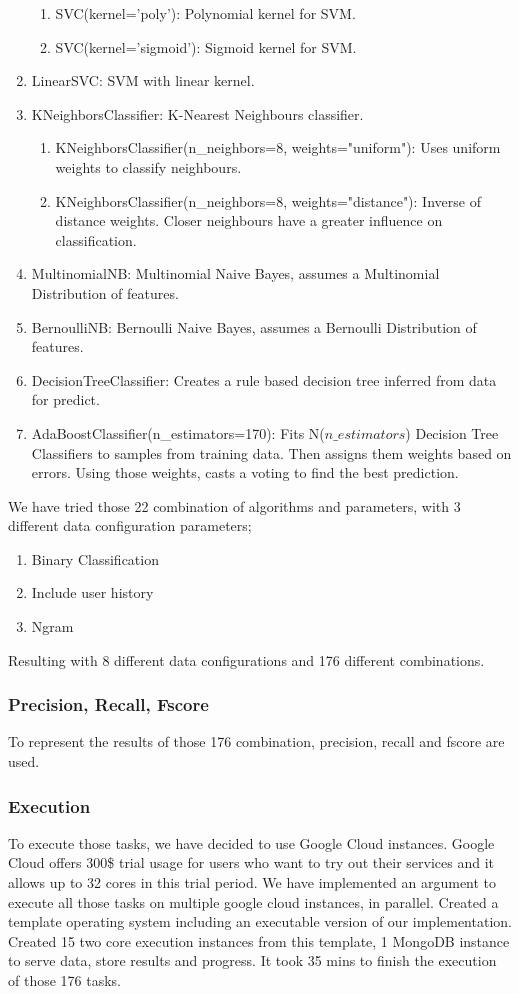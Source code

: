 \documentclass[twoside,11pt]{article}
\begin{document}
\begin{enumerate}
\begin{enumerate}
\item SVC(kernel='poly'): Polynomial kernel for SVM.
\item SVC(kernel='sigmoid'): Sigmoid kernel for SVM.
\end{enumerate}
\item LinearSVC: SVM with linear kernel.
\item KNeighborsClassifier: K-Nearest Neighbours classifier.
\begin{enumerate}
\item KNeighborsClassifier(n\_neighbors=8, weights="uniform"): Uses uniform weights to classify neighbours.
\item KNeighborsClassifier(n\_neighbors=8, weights="distance"): Inverse of distance weights. Closer neighbours have a greater influence on classification.
\end{enumerate}
\item MultinomialNB: Multinomial Naive Bayes, assumes a Multinomial Distribution of features.
\item BernoulliNB: Bernoulli Naive Bayes, assumes a Bernoulli Distribution of features.
\item DecisionTreeClassifier: Creates a rule based decision tree inferred from data for predict.
\item AdaBoostClassifier(n\_estimators=170): Fits N($n\_estimators$) Decision Tree Classifiers to samples from training data. Then assigns them weights based on errors. Using those weights, casts a voting to find the best prediction.
\end{enumerate}
\normalsize
We have tried those 22 combination of algorithms and parameters, with 3 different data configuration parameters; 
\footnotesize
\begin{enumerate}
\item Binary Classification
\item Include user history
\item Ngram
\end{enumerate}
\normalsize

Resulting with 8 different data configurations and 176 different combinations.

\subsubsection{Precision, Recall, Fscore}
To represent the results of those 176 combination, precision, recall and fscore are used.
\subsubsection{Execution}
To execute those tasks, we have decided to use Google Cloud instances. Google Cloud offers 300\$ trial usage for users who want to try out their services and it allows up to 32 cores in this trial period. We have implemented an argument to execute all those tasks on multiple google cloud instances, in parallel. Created a template operating system including an executable version of our implementation. Created 15 two core execution instances from this template, 1 MongoDB instance to serve data, store results and progress. It took 35 mins to finish the execution of those 176 tasks. 
\end{document}

